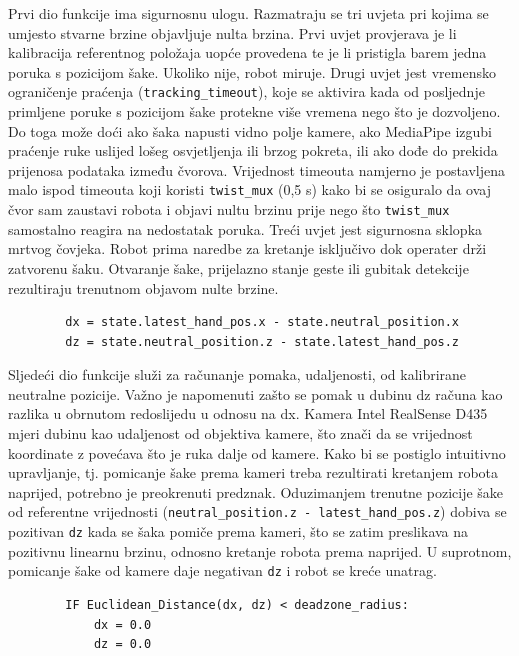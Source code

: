 \documentclass[12pt,a4paper,oneside]{report}
\begin{document}
Prvi dio funkcije ima sigurnosnu ulogu. Razmatraju se tri uvjeta pri kojima se umjesto stvarne brzine 
objavljuje nulta brzina. Prvi uvjet provjerava je li kalibracija referentnog položaja uopće provedena te 
je li pristigla barem jedna poruka s pozicijom šake. Ukoliko nije, robot miruje. Drugi uvjet jest vremensko 
ograničenje praćenja (\texttt{tracking\_timeout}), koje se aktivira kada od posljednje primljene poruke s 
pozicijom šake protekne više vremena nego što je dozvoljeno. Do toga može doći ako šaka napusti vidno polje 
kamere, ako MediaPipe izgubi praćenje ruke uslijed lošeg osvjetljenja ili brzog pokreta, ili ako dođe do 
prekida prijenosa podataka između čvorova. Vrijednost timeouta namjerno je postavljena malo ispod timeouta 
koji koristi \texttt{twist\_mux} (0,5 s) kako bi se osiguralo da ovaj čvor sam zaustavi robota i objavi 
nultu brzinu prije nego što \texttt{twist\_mux} samostalno reagira na nedostatak poruka. Treći uvjet jest 
sigurnosna sklopka mrtvog čovjeka. Robot prima naredbe za kretanje isključivo dok operater drži zatvorenu 
šaku. Otvaranje šake, prijelazno stanje geste ili gubitak detekcije rezultiraju trenutnom objavom nulte 
brzine.

\begin{verbatim}
        dx = state.latest_hand_pos.x - state.neutral_position.x
        dz = state.neutral_position.z - state.latest_hand_pos.z
\end{verbatim}

Sljedeći dio funkcije služi za računanje pomaka, udaljenosti, od kalibrirane neutralne pozicije. Važno je napomenuti 
zašto se pomak u dubinu dz računa kao razlika u obrnutom redoslijedu u odnosu na dx. Kamera Intel RealSense 
D435 mjeri dubinu kao udaljenost od objektiva kamere, što znači da se vrijednost koordinate z povećava što 
je ruka dalje od kamere. Kako bi se postiglo intuitivno upravljanje, tj. pomicanje šake prema kameri treba 
rezultirati kretanjem robota naprijed, potrebno je preokrenuti predznak. Oduzimanjem trenutne pozicije šake 
od referentne vrijednosti (\texttt{neutral\_position.z - latest\_hand\_pos.z}) dobiva se pozitivan \texttt{dz} 
kada se šaka pomiče prema kameri, što se zatim preslikava na pozitivnu linearnu brzinu, odnosno kretanje 
robota prema naprijed. U suprotnom, pomicanje šake od kamere daje negativan \texttt{dz} i robot se kreće 
unatrag.

\begin{verbatim}
        IF Euclidean_Distance(dx, dz) < deadzone_radius:
            dx = 0.0
            dz = 0.0
\end{verbatim}
\end{document}
